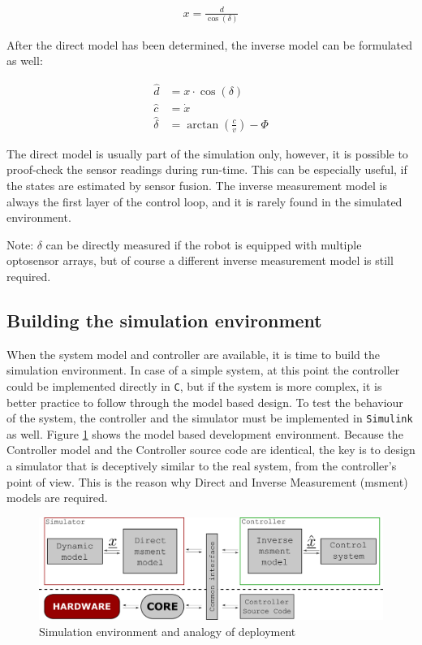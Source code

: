 \begin{align}
    x = \frac{d}{\cos(\delta)}
\end{align}

After the direct model has been determined, the inverse model can be formulated as well:

\begin{align}
    \hat{d} &= x \cdot \cos(\delta) \\
    \hat{c} &=\dot{x} \\
    \hat{\delta} &= \arctan \left(\frac{c}{v}\right) - \Phi
\end{align}

The direct model is usually part of the simulation only, however, it is possible to proof-check the sensor readings during run-time. This can be especially useful, if the states are estimated by sensor fusion. The inverse measurement model is always the first layer of the control loop, and it is rarely found in the simulated environment.

Note: $\delta$ can be directly measured if the robot is equipped with multiple optosensor arrays, but of course a different inverse measurement model is still required.

\subsection{Building the simulation environment}

When the system model and controller are available, it is time to build the simulation environment. In case of a simple system, at this point the controller could be implemented directly in \verb!C!, but if the system is more complex, it is better practice to follow through the model based design. To test the behaviour of the system, the controller and the simulator must be implemented in \verb!Simulink! as well. Figure \ref{fig:simenvironment} shows the model based development environment. Because the Controller model and the Controller source code are identical, the key is to design a simulator that is deceptively similar to the real system, from the controller's point of view. This is the reason why Direct and Inverse Measurement (msment) models are required.

\begin{figure}[!ht]
    \centering
    \includegraphics[width=0.7\linewidth]{img/simenvironment}
    \centering
    \caption{Simulation environment and analogy of deployment}
    \label{fig:simenvironment}
\end{figure}

